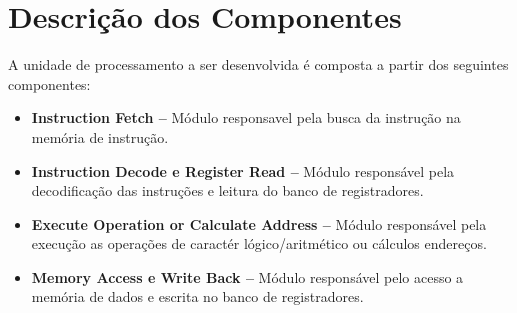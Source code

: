 \section{Descrição dos Componentes}
  A unidade de processamento a ser desenvolvida é composta a partir dos seguintes componentes:

  \begin{itemize}
    \item \textbf{Instruction Fetch --} Módulo responsavel pela busca da instrução na memória de instrução.
    \item \textbf{Instruction Decode e Register Read --} Módulo responsável pela decodificação das instruções e leitura do banco de registradores.
    \item \textbf{Execute Operation or Calculate Address --} Módulo responsável pela execução as operações de caractér lógico/aritmético ou cálculos endereços.
     \item \textbf{Memory Access e Write Back --} Módulo responsável pelo acesso a memória de dados e escrita no banco de registradores.
  \end{itemize}